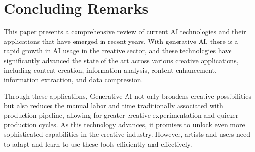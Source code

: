 \documentclass[11pt,a4paper]{article}
\begin{document}
\section{Concluding Remarks}
\label{sec:conclusion}

This paper presents a comprehensive review of current AI technologies and their applications that have emerged in recent years. With generative AI, there is a rapid growth in AI usage in the creative sector, and these technologies have significantly advanced the state of the art across various creative applications, including content creation, information analysis, content enhancement, information extraction, and data compression.

Through these applications, Generative AI not only broadens creative possibilities but also reduces the manual labor and time traditionally associated with production pipeline, allowing for greater creative experimentation and quicker production cycles. As this technology advances, it promises to unlock even more sophisticated capabilities in the creative industry. However, artists and users need to adapt and learn to use these tools efficiently and effectively.



\end{document}
